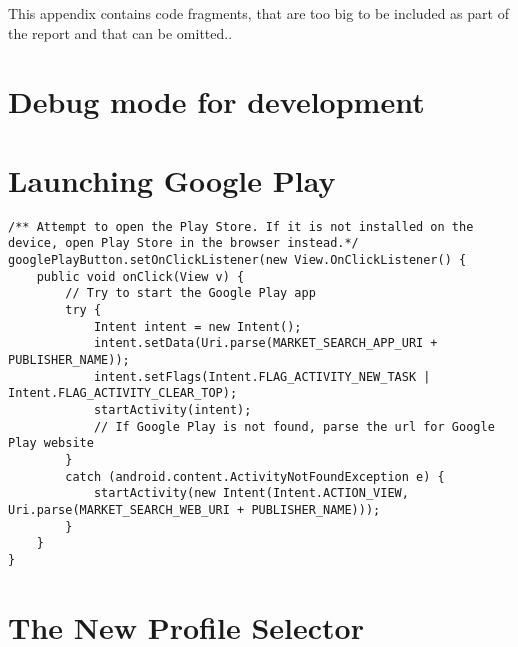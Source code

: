 This appendix contains code fragments, that are too big to be included as part of the report and that can be omitted..

\section {Debug mode for development}\label{appendix:debugmode}



\section{Launching Google Play}

\begin{lstlisting}[caption={The OnClickListener for the googlePlayButton, launching the Play Store correctly}, label={lst:launchergoogleplay}]
/** Attempt to open the Play Store. If it is not installed on the device, open Play Store in the browser instead.*/
googlePlayButton.setOnClickListener(new View.OnClickListener() {
	public void onClick(View v) {
		// Try to start the Google Play app
		try {
			Intent intent = new Intent();
			intent.setData(Uri.parse(MARKET_SEARCH_APP_URI + PUBLISHER_NAME));
			intent.setFlags(Intent.FLAG_ACTIVITY_NEW_TASK | Intent.FLAG_ACTIVITY_CLEAR_TOP);
			startActivity(intent);
			// If Google Play is not found, parse the url for Google Play website
		} 
		catch (android.content.ActivityNotFoundException e) {
			startActivity(new Intent(Intent.ACTION_VIEW, Uri.parse(MARKET_SEARCH_WEB_URI + PUBLISHER_NAME)));
		}
	}
}
\end{lstlisting}

\section{The New Profile Selector}

